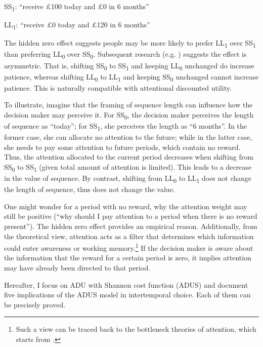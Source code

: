 \documentclass[
  12pt,
]{article}
\begin{document}
\setlength{\leftskip}{1cm}

SS\textsubscript{1}: ``receive £100 today and £0 in 6 months''

LL\textsubscript{1}: ``receive £0 today and £120 in 6 months''

\setlength{\leftskip}{0pt}

The hidden zero effect suggests people may be more likely to prefer
LL\textsubscript{1} over SS\textsubscript{1} than preferring
LL\textsubscript{0} over SS\textsubscript{0}. Subsequent research (e.g.
\citet{read_value_2017}) suggests the effect is asymmetric. That is,
shifting SS\textsubscript{0} to SS\textsubscript{1} and keeping
LL\textsubscript{0} unchanged do increase patience, whereas shifting
LL\textsubscript{0} to LL\textsubscript{1} and keeping
SS\textsubscript{0} unchanged cannot increase patience. This is
naturally compatible with attentional discounted utility.

To illustrate, imagine that the framing of sequence length can influence
how the decision maker may perceive it. For SS\textsubscript{0}, the
decision maker perceives the length of sequence as ``today''; for
SS\textsubscript{1}, she perceives the length as ``6 months''. In the
former case, she can allocate no attention to the future; while in the
latter case, she needs to pay some attention to future periods, which
contain no reward. Thus, the attention allocated to the current period
decreases when shifting from SS\textsubscript{0} to SS\textsubscript{1}
(given total amount of attention is limited). This leads to a decrease
in the value of sequence. By contrast, shifting from LL\textsubscript{0}
to LL\textsubscript{1} does not change the length of sequence, thus does
not change the value.

One might wonder for a period with no reward, why the attention weight
may still be positive (``why should I pay attention to a period when
there is no reward present''). The hidden zero effect provides an
empirical reason. Additionally, from the theoretical view, attention
acts as a filter that determines which information could enter awareness
or working memory.\footnote{Such a view can be traced back to the
  bottleneck theories of attention, which starts from
  \citet{broadbent_perception_1958}.} If the decision maker is aware
about the information that the reward for a certain period is zero, it
implies attention may have already been directed to that period.

Hereafter, I focus on ADU with Shannon cost function (ADUS) and document
five implications of the ADUS model in intertemporal choice. Each of
them can be precisely proved.
\end{document}

